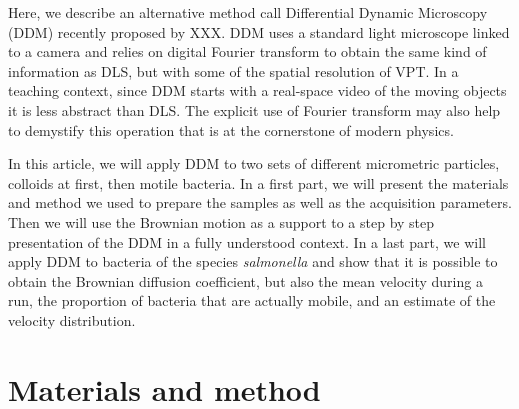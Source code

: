 \documentclass[%
 aip,
 jmp,%
 amsmath,amssymb,
reprint,%
]{revtex4-1}
\begin{document}

 

Here, we describe an alternative method call Differential Dynamic Microscopy (DDM) recently proposed by XXX. DDM uses a standard light microscope linked to a camera and relies on digital Fourier transform to obtain the same kind of information as DLS, but with some of the spatial resolution of VPT. In a teaching context, since DDM starts with a real-space video of the moving objects it is less abstract than DLS. The explicit use of Fourier transform may also help to demystify this operation that is at the cornerstone of modern physics. 

In this article, we will apply DDM to two sets of different micrometric particles, colloids at first, then motile bacteria. In a first part, we will present the materials and method we used to prepare the samples as well as the acquisition parameters. Then we will use the Brownian motion as a support to a step by step presentation of the DDM in a fully understood context. In a last part, we will apply DDM to bacteria of the species \textit{salmonella} and show that it is possible to obtain the Brownian diffusion coefficient, but also the mean velocity during a run, the proportion of bacteria that are actually mobile, and an estimate of the velocity distribution.

\section{Materials and method}

\end{document}
